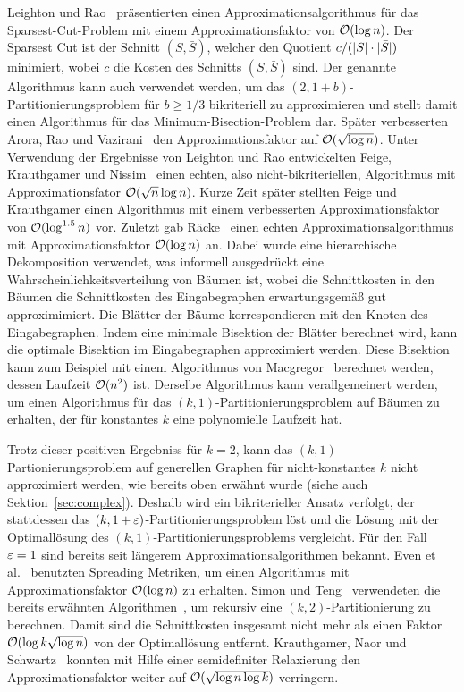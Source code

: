 Leighton und Rao~\cite{LR99} präsentierten einen Approximationsalgorithmus für das Sparsest-Cut-Problem mit einem Approximationsfaktor von $\mathcal{O}(\log n)$.
Der Sparsest Cut ist der Schnitt $(S, \bar{S})$, welcher den Quotient $c/(\lvert S\rvert \cdot  \lvert\bar{S}\rvert)$ minimiert, wobei $c$ die Kosten des Schnitts $(S, \bar{S})$ sind.
Der genannte Algorithmus kann auch verwendet werden, um das $(2, 1 + b)$\hyp Partitionierungsproblem für $b \geq 1/3$ bikriteriell zu approximieren und stellt damit einen Algorithmus für das Minimum-Bisection-Problem dar.
Später verbesserten Arora, Rao und Vazirani~\cite{ARV09} den Approximationsfaktor auf $\mathcal{O}(\sqrt{\log n})$.
Unter Verwendung der Ergebnisse von Leighton und Rao entwickelten Feige, Krauthgamer und Nissim~\cite{FKN00} einen echten, also nicht-bikriteriellen, Algorithmus mit Approximationsfator $\mathcal{O}(\sqrt{n} \log n)$.
Kurze Zeit später stellten Feige und Krauthgamer einen Algorithmus mit einem verbesserten Approximationsfaktor von $\mathcal{O}(\log^{1.5} n)$ vor.
Zuletzt gab Räcke~\cite{rc08} einen echten Approximationsalgorithmus mit Approximationsfaktor $\mathcal{O}(\log n)$ an.
Dabei wurde eine hierarchische Dekomposition verwendet, was informell ausgedrückt eine Wahrscheinlichkeitsverteilung von Bäumen ist, wobei die Schnittkosten in den Bäumen die Schnittkosten des Eingabegraphen erwartungsgemäß gut approximimiert.
Die Blätter der Bäume korrespondieren mit den Knoten des Eingabegraphen.
Indem eine minimale Bisektion der Blätter berechnet wird, kann die optimale Bisektion im Eingabegraphen approximiert werden.
Diese Bisektion kann zum Beispiel mit einem Algorithmus von Macgregor~\cite{mcg78} berechnet werden, dessen Laufzeit $\mathcal{O}(n^2)$ ist.
Derselbe Algorithmus kann verallgemeinert werden, um einen Algorithmus für das $(k, 1)$\hyp Partitionierungsproblem auf Bäumen zu erhalten, der für konstantes $k$ eine polynomielle Laufzeit hat.

Trotz dieser positiven Ergebniss für $k=2$, kann das $(k, 1)$\hyp Partionierungsproblem auf generellen Graphen für nicht-konstantes $k$ nicht approximiert werden, wie bereits oben erwähnt wurde (siehe auch Sektion~\ref{sec:complex}).
Deshalb wird ein bikriterieller Ansatz verfolgt, der stattdessen das $(k,1+\varepsilon)$\hyp Partitionierungsproblem löst und die Lösung mit der Optimallösung des $(k, 1)$\hyp Partitionierungsproblems vergleicht.
Für den Fall $\varepsilon = 1$ sind bereits seit längerem Approximationsalgorithmen bekannt.
Even et al.~\cite{ENR+97} benutzten Spreading Metriken, um einen Algorithmus mit Approximationsfaktor $\mathcal{O}(\log n)$ zu erhalten.
Simon und Teng~\cite{ST97} verwendeten die bereits erwähnten Algorithmen~\cite{LR99, ARV09}, um rekursiv eine $(k, 2)$\hyp Partitionierung zu berechnen.
Damit sind die Schnittkosten insgesamt nicht mehr als einen Faktor $\mathcal{O}(\log k \sqrt{\log n})$ von der Optimallösung entfernt.
Krauthgamer, Naor und Schwartz~\cite{KNS09} konnten mit Hilfe einer semidefiniter Relaxierung den Approximationsfaktor weiter auf $\mathcal{O}(\sqrt{\log n \log k})$ verringern.

